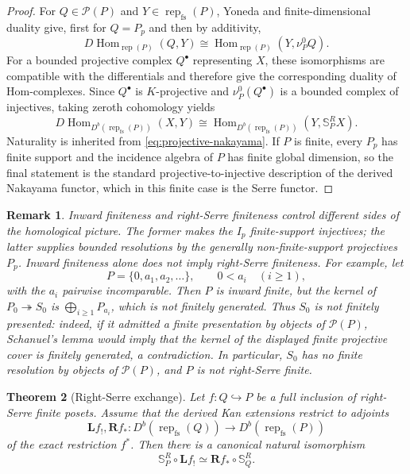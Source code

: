 \documentclass[10pt,a4paper]{amsart}
\newtheorem{theorem}{Theorem}[section]
\newtheorem{remark}[theorem]{Remark}
\newcommand{\Rep}{\operatorname{rep}}
\newcommand{\Hom}{\operatorname{Hom}}
\begin{document}
\begin{proof}
For $Q\in\mathcal P(P)$ and $Y\in\Rep_{\mathrm{fs}}(P)$, Yoneda and
finite-dimensional duality give, first for $Q=P_p$ and then by additivity,
\[
D\Hom_{\Rep(P)}(Q,Y)
\cong
\Hom_{\Rep(P)}(Y,\nu_P^0Q).
\]
For a bounded projective complex $Q^\bullet$ representing $X$, these
isomorphisms are compatible with the differentials and therefore give the
corresponding duality of Hom-complexes.  Since $Q^\bullet$ is $K$-projective
and $\nu_P^0(Q^\bullet)$ is a bounded complex of injectives, taking
zeroth cohomology yields
\[
D\Hom_{D^b(\Rep_{\mathrm{fs}}(P))}(X,Y)
\cong
\Hom_{D^b(\Rep_{\mathrm{fs}}(P))}(Y,\mathbb S_P^R X).
\]
Naturality is inherited from \eqref{eq:projective-nakayama}.  If $P$ is
finite, every $P_p$ has finite support and the incidence algebra of $P$ has
finite global dimension, so the final statement is the standard
projective-to-injective description of the derived Nakayama functor, which in
this finite case is the Serre functor.
\end{proof}

\begin{remark}\label{rem:inward-not-serre}
Inward finiteness and right-Serre finiteness control different sides of the
homological picture.  The former makes the $I_p$ finite-support injectives;
the latter supplies bounded resolutions by the generally non-finite-support
projectives $P_p$.  Inward finiteness alone does not imply right-Serre
finiteness.  For example, let
\[
P=\{0,a_1,a_2,\ldots\},
\qquad
0<a_i\quad(i\ge1),
\]
with the $a_i$ pairwise incomparable.  Then $P$ is inward finite, but the
kernel of $P_0\twoheadrightarrow S_0$ is
$\bigoplus_{i\ge1}P_{a_i}$, which is not finitely generated.  Thus $S_0$
is not finitely presented: indeed, if it admitted a finite presentation by
objects of $\mathcal P(P)$, Schanuel's lemma would imply that the kernel of
the displayed finite projective cover is finitely generated, a contradiction.
In particular, $S_0$ has no finite resolution by objects of
$\mathcal P(P)$, and $P$ is not right-Serre finite.
\end{remark}

\begin{theorem}[Right-Serre exchange]\label{thm:right-serre-exchange}
Let $f:Q\hookrightarrow P$ be a full inclusion of right-Serre finite posets.
Assume that the derived Kan extensions restrict to adjoints
\[
\mathbf L f_!,\mathbf R f_*:
D^b(\Rep_{\mathrm{fs}}(Q))\longrightarrow
D^b(\Rep_{\mathrm{fs}}(P))
\]
of the exact restriction $f^*$.  Then there is a canonical natural
isomorphism
\begin{equation}\label{eq:general-right-serre-exchange}
\boxed{\mathbb S_P^R\circ\mathbf L f_!
\simeq\mathbf R f_*\circ\mathbb S_Q^R.}
\end{equation}
\end{theorem}
\end{document}
